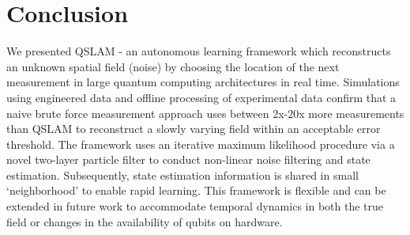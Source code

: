 \section{Conclusion \label{sec:conclusion}}

We presented QSLAM - an autonomous learning framework which reconstructs an unknown spatial field (noise)  by choosing the location of the next measurement in large quantum  computing architectures in real time. Simulations using engineered data and offline processing of experimental data confirm that a naive brute force measurement approach uses between $2$x-$20$x more measurements  than QSLAM to reconstruct a slowly varying field within an acceptable error threshold. The framework uses an iterative maximum likelihood procedure via a novel two-layer particle filter to conduct non-linear noise filtering and state estimation. Subsequently, state estimation information is shared in small `neighborhood' to enable rapid learning. This framework is flexible and can be extended in future work to accommodate temporal dynamics in both the true field or changes in the availability of qubits on hardware.


